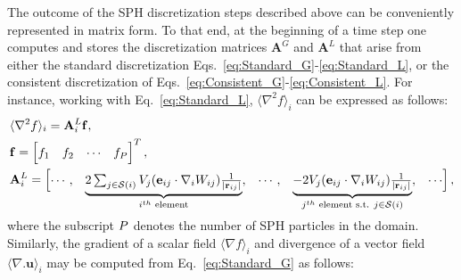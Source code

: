 The outcome of the SPH discretization steps described above can be conveniently represented in matrix form. To that end, at the beginning of a time step one computes and stores the discretization matrices $\mathbf{A}^G$ and $\mathbf{A}^L$ that arise from either the standard discretization Eqs.~\ref{eq:Standard_G}-\ref{eq:Standard_L}, or the consistent discretization of  Eqs.~\ref{eq:Consistent_G}-\ref{eq:Consistent_L}. For instance, working with Eq.~\ref{eq:Standard_L}, $\langle \nabla^2 f \rangle_i$ can be expressed as follows:
\begin{align}\renewcommand{\arraystretch}{1.2}
&\langle \nabla^2 f \rangle_i=\mathbf{A}^L_i \mathbf{f},\\
&\mathbf{f}= \begin{bmatrix}
f_1&f_2&\cdots&f_{\nParticles}
\end{bmatrix}^T,\\
&\mathbf{A}^L_i= \begin{bmatrix}
\cdots, & 
\smash[b]{\underbrace{\begin{matrix}2\sum_{j \in \support{i}} V_j ( \mathbf{e}_{ij} \cdot \nabla_i W_{ij}) \frac{1}{|\mathbf{r}_{ij}|} \end{matrix}}_{i^{th}\text{ element} }},
&\cdots, &\smash[b]{\underbrace{\begin{matrix}-2 V_j ( \mathbf{e}_{ij} \cdot \nabla_i W_{ij}) \frac{1}{|\mathbf{r}_{ij}|}\end{matrix}}_{j^{th}\text{ element s.t. }{j \in \support{i}} }}, & \cdots
\end{bmatrix},
\end{align}
\\
where the subscript ${P}$ denotes the number of SPH particles in the domain. Similarly, the gradient of a scalar field $\langle \nabla f \rangle_i$ and divergence of a vector field $\langle \nabla . \mathbf{u} \rangle_i$ may be computed from Eq.~\ref{eq:Standard_G} as follows:
